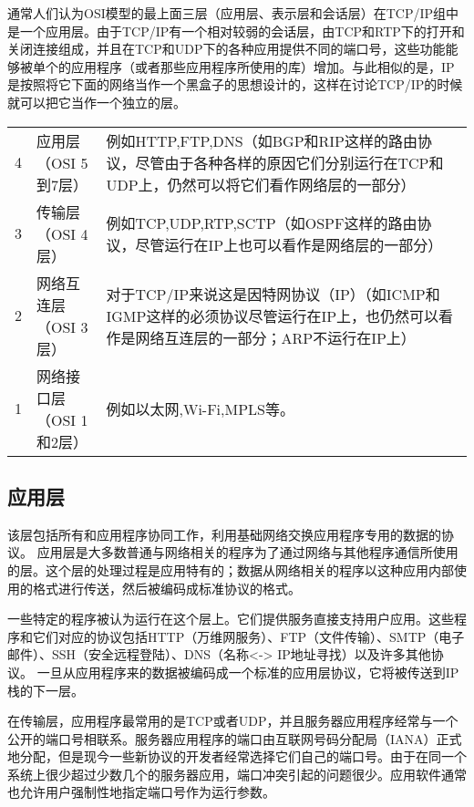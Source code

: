 通常人们认为OSI模型的最上面三层（应用层、表示层和会话层）在TCP/IP组中是一个应用层。由于TCP/IP有一个相对较弱的会话层，由TCP和RTP下的打开和关闭连接组成，并且在TCP和UDP下的各种应用提供不同的端口号，这些功能能够被单个的应用程序（或者那些应用程序所使用的库）增加。与此相似的是，IP是按照将它下面的网络当作一个黑盒子的思想设计的，这样在讨论TCP/IP的时候就可以把它当作一个独立的层。

\begin{table}[!ht]
\centering
{}
\begin{tabular}{m{10pt}|m{60pt}|m{310pt}|}
\cline{2-3}
4&{\footnotesize 应用层\newline （OSI 5到7层）}&{\footnotesize 例如HTTP,FTP,DNS（如BGP和RIP这样的路由协议，尽管由于各种各样的原因它们分别运行在TCP和UDP上，仍然可以将它们看作网络层的一部分）}\\
3&{\footnotesize 传输层\newline （OSI 4层）}&{\footnotesize 例如TCP,UDP,RTP,SCTP（如OSPF这样的路由协议，尽管运行在IP上也可以看作是网络层的一部分）}\\
2&{\footnotesize 网络互连层\newline （OSI 3层）}&{\footnotesize 对于TCP/IP来说这是因特网协议（IP）（如ICMP和IGMP这样的必须协议尽管运行在IP上，也仍然可以看作是网络互连层的一部分；ARP不运行在IP上）}\\
1&{\footnotesize 网络接口层\newline （OSI 1和2层）}&{\footnotesize 例如以太网,Wi-Fi,MPLS等。}\\ \cline{2-3}
\end{tabular}
\end{table}


\subsection{应用层}


该层包括所有和应用程序协同工作，利用基础网络交换应用程序专用的数据的协议。 应用层是大多数普通与网络相关的程序为了通过网络与其他程序通信所使用的层。这个层的处理过程是应用特有的；数据从网络相关的程序以这种应用内部使用的格式进行传送，然后被编码成标准协议的格式。

一些特定的程序被认为运行在这个层上。它们提供服务直接支持用户应用。这些程序和它们对应的协议包括HTTP（万维网服务）、FTP（文件传输）、SMTP（电子邮件）、SSH（安全远程登陆）、DNS（名称<-> IP地址寻找）以及许多其他协议。
一旦从应用程序来的数据被编码成一个标准的应用层协议，它将被传送到IP栈的下一层。

在传输层，应用程序最常用的是TCP或者UDP，并且服务器应用程序经常与一个公开的端口号相联系。服务器应用程序的端口由互联网号码分配局（IANA）正式地分配，但是现今一些新协议的开发者经常选择它们自己的端口号。由于在同一个系统上很少超过少数几个的服务器应用，端口冲突引起的问题很少。应用软件通常也允许用户强制性地指定端口号作为运行参数。

